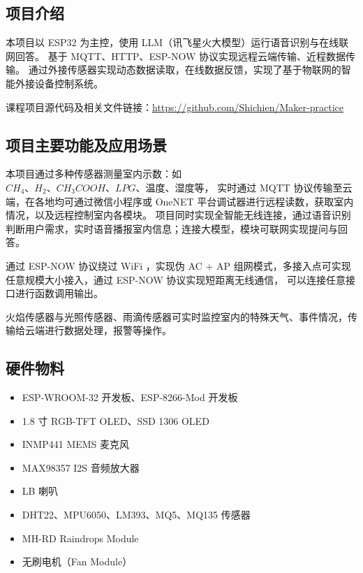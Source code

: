 
\subsection{项目介绍}

本项目以 ESP32 为主控，使用 LLM（讯飞星火大模型）运行语音识别与在线联网回答。
基于 MQTT、HTTP、ESP-NOW 协议实现远程云端传输、近程数据传输。
通过外接传感器实现动态数据读取，在线数据反馈，实现了基于物联网的智能外接设备控制系统。

课程项目源代码及相关文件链接：\href{https://github.com/Shichien/Maker-practice}{\underline{https://github.com/Shichien/Maker-practice}}

\subsection{项目主要功能及应用场景}

本项目通过多种传感器测量室内示数：如$CH_4、H_2、CH_3COOH、LPG、温度、湿度$等，
实时通过 MQTT 协议传输至云端，在各地均可通过微信小程序或 OneNET 平台调试器进行远程读数，获取室内情况，以及远程控制室内各模块。
项目同时实现全智能无线连接，通过语音识别判断用户需求，实时语音播报室内信息；连接大模型，模块可联网实现提问与回答。

通过 ESP-NOW 协议绕过 WiFi ，实现伪 AC + AP 组网模式，多接入点可实现任意规模大小接入，通过 ESP-NOW 协议实现短距离无线通信，
可以连接任意接口进行函数调用输出。

火焰传感器与光照传感器、雨滴传感器可实时监控室内的特殊天气、事件情况，传输给云端进行数据处理，报警等操作。

\subsection{硬件物料}

\begin{itemize}
    \item ESP-WROOM-32 开发板、ESP-8266-Mod 开发板
    \item 1.8 寸 RGB-TFT OLED、SSD 1306 OLED
    \item INMP441 MEMS 麦克风
    \item MAX98357 I2S 音频放大器
    \item LB 喇叭
    \item DHT22、MPU6050、LM393、MQ5、MQ135 传感器
    \item MH-RD Raindrops Module
    \item 无刷电机（Fan Module）
\end{itemize}


